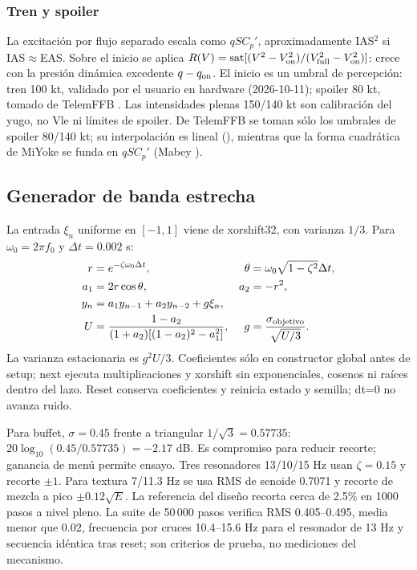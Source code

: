 \subsubsection{Tren y spoiler}
La excitación por flujo separado escala como $qSC_p'$, aproximadamente IAS$^2$ si IAS$\approx$EAS. Sobre el inicio se aplica $R(V)=\operatorname{sat}[(V^2-V_{\rm on}^2)/(V_{\rm full}^2-V_{\rm on}^2)]$: crece con la presión dinámica excedente $q-q_{\rm on}$. El inicio es un umbral de percepción: tren 100 kt, validado por el usuario en hardware (2026-10-11); spoiler 80 kt, tomado de TelemFFB \cite{telemffb}. Las intensidades plenas 150/140 kt son calibración del yugo, no Vle ni límites de spoiler. De TelemFFB se toman sólo los umbrales de spoiler 80/140 kt; su interpolación es lineal (), mientras que la forma cuadrática de MiYoke se funda en $qSC_p'$ (Mabey \cite{mabey1988}).



\subsection{Generador de banda estrecha}
La entrada $\xi_n$ uniforme en $[-1,1]$ viene de xorshift32, con varianza $1/3$. Para $\omega_0=2\pi f_0$ y $\Delta t=0.002$ s:
\begin{align}
r&=e^{-\zeta\omega_0\Delta t},&\theta&=\omega_0\sqrt{1-\zeta^2}\Delta t,\\
a_1&=2r\cos\theta,&a_2&=-r^2,\\
y_n&=a_1y_{n-1}+a_2y_{n-2}+g\xi_n,\\
U&=\frac{1-a_2}{(1+a_2)[(1-a_2)^2-a_1^2]},&g&=\frac{\sigma_{\rm objetivo}}{\sqrt{U/3}}.
\end{align}
La varianza estacionaria es $g^2U/3$. Coeficientes sólo en constructor global antes de setup; next ejecuta multiplicaciones y xorshift sin exponenciales, cosenos ni raíces dentro del lazo. Reset conserva coeficientes y reinicia estado y semilla; dt=0 no avanza ruido.

Para buffet, $\sigma=0.45$ frente a triangular $1/\sqrt3=0.57735$: $20\log_{10}(0.45/0.57735)=-2.17$ dB. Es compromiso para reducir recorte; ganancia de menú permite ensayo. Tres resonadores 13/10/15 Hz usan $\zeta=0.15$ y recorte $\pm1$. Para textura 7/11.3 Hz se usa RMS de senoide 0.7071 y recorte de mezcla a pico $\pm0.12\sqrt E$. La referencia del diseño recorta cerca de 2.5\% en 1000 pasos a nivel pleno. La suite de 50\,000 pasos verifica RMS 0.405--0.495, media menor que 0.02, frecuencia por cruces 10.4--15.6 Hz para el resonador de 13 Hz y secuencia idéntica tras reset; son criterios de prueba, no mediciones del mecanismo.


